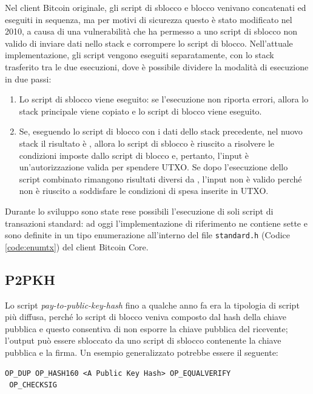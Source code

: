 Nel client Bitcoin originale, gli script di sblocco e blocco venivano concatenati ed eseguiti in sequenza, ma per motivi di sicurezza questo è stato modificato nel 2010, a causa di una vulnerabilità che ha permesso a uno script di sblocco non valido di inviare dati nello stack e corrompere lo script di blocco.
Nell'attuale implementazione, gli script vengono eseguiti separatamente, con lo stack trasferito tra le due esecuzioni, dove è possibile dividere la modalità di esecuzione in due passi:

\begin{enumerate}
  \item Lo script di sblocco viene eseguito: se l’esecuzione non riporta errori, allora lo stack principale viene copiato e lo script di blocco viene eseguito.
  \item Se, eseguendo lo script di blocco con i dati dello stack precedente, nel nuovo stack il risultato è , allora lo script di sblocco è riuscito a risolvere le condizioni imposte dallo script di blocco e, pertanto, l'input è un'autorizzazione valida per spendere UTXO. Se dopo l'esecuzione dello script combinato rimangono risultati diversi da , l'input non è valido perché non è riuscito a soddisfare le condizioni di spesa inserite in UTXO.
\end{enumerate}

Durante lo sviluppo sono state rese possibili l’esecuzione di soli script di transazioni standard: ad oggi l’implementazione di riferimento ne contiene sette e sono definite in un tipo enumerazione all’interno del file {\tt{standard.h}} (Codice \ref{code:enumtx}) del client Bitcoin Core.



\subsection{P2PKH}
Lo script {\it pay-to-public-key-hash \/} fino a qualche anno fa era la tipologia di script più diffusa, perché lo script di blocco veniva composto dal hash della chiave pubblica e questo consentiva di non esporre la chiave pubblica del ricevente; l’output può essere sbloccato da uno script di sblocco contenente la chiave pubblica e la firma. Un esempio generalizzato potrebbe essere il seguente:

\begin{lstlisting}[language=bitcoinscript, caption={P2PKH Script di blocco.}]
 OP_DUP OP_HASH160 <A Public Key Hash> OP_EQUALVERIFY
 OP_CHECKSIG
\end{lstlisting}

